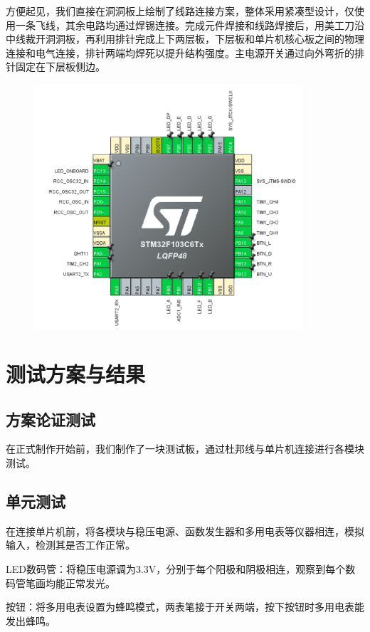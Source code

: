 \documentclass[a4paper,11pt,UTF8]{ctexart}
\newcommand{\bottomcaption}{%
\setlength{\abovecaptionskip}{6bp}%
\setlength{\belowcaptionskip}{6bp}%
\caption}
\newcommand{\xiaowuhao}{\fontsize{9bp}{9bp}\selectfont}   %
\begin{document}
方便起见，我们直接在洞洞板上绘制了线路连接方案，整体采用紧凑型设计，仅使用一条飞线，其余电路均通过焊锡连接。完成元件焊接和线路焊接后，用美工刀沿中线裁开洞洞板，再利用排针完成上下两层板，下层板和单片机核心板之间的物理连接和电气连接，排针两端均焊死以提升结构强度。主电源开关通过向外弯折的排针固定在下层板侧边。

\begin{figure}[!htbp]
    \centering
    \includegraphics[width=10cm]{image12.png}
    \bottomcaption{\xiaowuhao{CubeMX管脚配置}}
\end{figure}

\section{测试方案与结果}

\subsection{方案论证测试}

在正式制作开始前，我们制作了一块测试板，通过杜邦线与单片机连接进行各模块测试。

\subsection{单元测试}

在连接单片机前，将各模块与稳压电源、函数发生器和多用电表等仪器相连，模拟输入，检测其是否工作正常。

LED数码管：将稳压电源调为3.3V，分别于每个阳极和阴极相连，观察到每个数码管笔画均能正常发光。

按钮：将多用电表设置为蜂鸣模式，两表笔接于开关两端，按下按钮时多用电表能发出蜂鸣。
\end{document}
